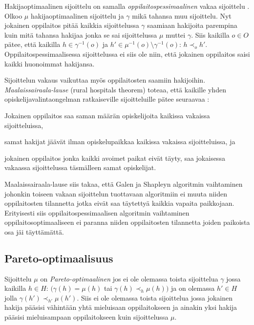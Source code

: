 \documentclass[gradu, twoside]{tktltiki}
\begin{document}
Hakijaoptimaalinen sijoittelu on samalla
\emph{oppilaitospessimaalinen} vakaa sijoittelu \cite{gusfield89}.
Olkoo $\mu$ hakijaoptimaalinen sijoittelu ja $\gamma$ mikä tahansa muu
sijoittelu. Nyt jokainen oppilaitos pitää kaikkia sijoittelussa
$\gamma$ saamiaan hakijoita parempina kuin mitä tahansa hakijaa jonka
se sai sijoittelussa $\mu$ muttei $\gamma$. Siis kaikilla $o \in O$
pätee, että kaikilla $h \in \gamma^{-1}(o)$ ja $h' \in \mu^{-1}(o)
\setminus \gamma^{-1}(o)$: $h \prec_o h'$. Oppilaitospessimaalisessa
sijoittelussa ei siis ole niin, että jokainen oppilaitos saisi kaikki
huonoimmat hakijansa.
\newpage

Sijoittelun vakaus vaikuttaa myös oppilaitosten saamiin hakijoihin.
\emph{Maalaissairaala-lause} (rural hospitals theorem) toteaa, että
kaikille yhden opiskelijavalintaongelman ratkaiseville sijoitteluille
pätee seuraavaa \cite{gusfield89}:

\begin{itemize*}
  \item Jokainen oppilaitos saa saman määrän opiskelijoita kaikissa
    vakaissa sijoitteluissa,
  \item samat hakijat jäävät ilman opiskelupaikkaa kaikissa vakaissa
    sijoitteluissa, ja
  \item jokainen oppilaitos jonka kaikki avoimet paikat eivät täyty,
    saa jokaisessa vakaassa sijoittelussa täsmälleen samat
    opiskelijat.
\end{itemize*}

Maalaissairaala-lause siis takaa, että Galen ja Shapleyn algoritmin
vaihtaminen johonkin toiseen vakaan sijoittelun tuottavaan algoritmiin
ei muuta niiden oppilaitosten tilannetta jotka eivät saa täytettyä
kaikkia vapaita paikkojaan. Erityisesti siis oppilaitospessimaalisen
algoritmin vaihtaminen oppilaitosoptimaaliseen ei paranna niiden
oppilaitosten tilannetta joiden paikoista osa jäi täyttämättä.

\subsection{Pareto-optimaalisuus}

Sijoittelu $\mu$ on \emph{Pareto-optimaalinen} jos ei ole olemassa
toista sijoittelua $\gamma$ jossa kaikilla $h \in H$: $(\gamma(h) =
\mu(h)$ tai $\gamma(h) \prec_h \mu(h))$ ja on olemassa $h' \in H$
jolla $\gamma(h') \prec_{h'} \mu(h')$. Siis ei ole olemassa toista
sijoittelua jossa jokainen hakija pääsisi vähintään yhtä mieluisaan
oppilaitokseen ja ainakin yksi hakija pääsisi mieluisampaan
oppilaitokseen kuin sijoittelussa $\mu$.
\end{document}
